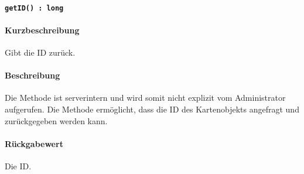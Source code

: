 \paragraph{\texttt{getID() : long}}%
\paragraph*{Kurzbeschreibung}
Gibt die ID zurück.
\paragraph*{Beschreibung}
Die Methode ist serverintern und wird somit nicht explizit vom Administrator aufgerufen.
Die Methode ermöglicht, dass die ID des Kartenobjekts angefragt und zurückgegeben werden kann.
\paragraph*{Rückgabewert}
Die ID.
